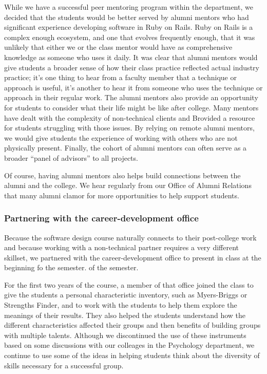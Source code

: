 While we have a successful peer mentoring program within the department,
we decided that the students would be better served by alumni mentors
who had significant experience developing software in Ruby on Rails.
Ruby on Rails is a complex enough ecosystem, and one that evolves
frequently enough, that it was unlikely that either we or the class
mentor would have as comprehensive knowledge as someone who uses
it daily.  It was clear that alumni mentors would give students a
broader sense of how their class practice reflected actual industry
practice; it's one thing to hear from a faculty member that a
technique or approach is useful, it's another to hear it from someone
who uses the technique or approach in their regular work.  The
alumni mentors also provide an opportunity for students to consider
what their life might be like after college.  Many mentors have
dealt with the complexity of non-technical clients and Brovided a
resource for students struggling with those issues.  By relying on
remote alumni mentors, we would give students the experience of
working with others who are not physically present.  Finally, the
cohort of alumni mentors can often serve as a broader ``panel of
advisors'' to all projects.

Of course, having alumni mentors also helps build connections between
the alumni and the college.  We hear regularly from our Office of
Alumni Relations that many alumni clamor for more opportunities to
help support students.

\subsubsection{Partnering with the career-development office}

Because the software design course naturally connects to their
post-college work and because working with a non-technical partner
requires a very different skillset, we partnered with the 
career-development office to present in class at the beginning
fo the semester.
of the semester. 

For the first two years of the course, a member of that office
joined the class to give the students a personal characteristic
inventory, such as Myers-Briggs or Strengths Finder, and to work
with the students to help them explore the meanings of their results.
They also helped the students understand how the different
characteristics affected their groups and then benefits of building
groups with multiple talents.  Although we discontinued the use of
these instruments based on some discussions with our colleages in
the Psychology department, we continue to use some of the ideas in
helping students think about the diversity of skills necessary for
a successful group.

